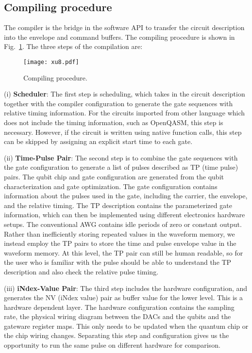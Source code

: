 \documentclass{ieeetran}
\begin{document}
\subsection{Compiling procedure}
The compiler is the bridge in the software API to transfer the circuit description into the envelope and command buffers.
The compiling procedure is shown in Fig.~\ref{fig:compiler}.
The three steps of the compilation are:

\begin{figure}[!ht]
\centering
\texttt{[image: xu8.pdf]} 
\caption{Compiling procedure.}
\label{fig:compiler}
\end{figure}

(i) \textbf{Scheduler}: 
The first step is scheduling, which takes in the circuit description together with the compiler configuration to generate the gate sequences with relative timing information. 
For the circuits imported from other language which does not include the timing information, such as OpenQASM, this step is necessary. 
However, if the circuit is written using native function calls, this step can be skipped by assigning an explicit start time to each gate.

(ii) \textbf{Time-Pulse Pair}: 
The second step is to combine the gate sequences with the gate configuration to generate a list of pulses described as TP (time pulse) pairs. 
The qubit chip and gate configuration are generated from the qubit characterization and gate optimization. 
The gate configuration contains information about the pulses used in the gate, including the carrier, the envelope, and the relative timing.
The TP description contains the parameterized gate information, which can then be implemented using different electronics hardware setups. 
The conventional AWG contains idle periods of zero or constant output. 
Rather than inefficiently storing repeated values in the waveform memory, we instead employ the TP pairs to store the time and pulse envelope value in the waveform memory.
At this level, the TP pair can still be human readable, so for the user who is familiar with the pulse should be able to understand the TP description and also check the relative pulse timing.
    
(iii) \textbf{iNdex-Value Pair}: 
The third step includes the hardware configuration, and generates the NV (iNdex value) pair as buffer value for the lower level. 
This is a hardware dependent layer. 
The hardware configuration contains the sampling rate, the physical wiring diagram between the DACs and the qubits and the gateware register maps. 
This only needs to be updated when the quantum chip or the chip wiring changes. 
Separating this step and configuration gives us the opportunity to run the same pulse on different hardware for comparison.
\end{document}
